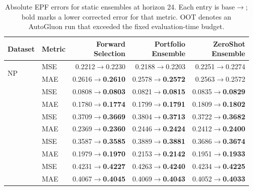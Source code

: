 \begin{table}[t]
\centering
\small
\setlength{\tabcolsep}{5pt}
\caption{Absolute EPF errors for static ensembles at horizon 24. Each entry is base$\rightarrow$\method{}; bold marks a lower corrected error for that metric. OOT denotes an AutoGluon run that exceeded the fixed evaluation-time budget.}
\label{tab:strong-epf-absolute-ensembles}
\begin{tabular}{llrrr}
\toprule
Dataset & Metric & \shortstack{Forward\\Selection} & \shortstack{Portfolio\\Ensemble} & \shortstack{ZeroShot\\Ensemble}\\
\midrule
\multirow{2}{*}{NP} & MSE & 0.2212$\rightarrow$0.2230 & 0.2188$\rightarrow$0.2203 & 0.2251$\rightarrow$0.2274\\
 & MAE & 0.2616$\rightarrow$\textbf{0.2610} & 0.2578$\rightarrow$\textbf{0.2572} & 0.2563$\rightarrow$0.2572\\
\addlinespace[1pt]
\multirow{2}{*}{PJM} & MSE & 0.0808$\rightarrow$\textbf{0.0803} & 0.0821$\rightarrow$\textbf{0.0815} & 0.0835$\rightarrow$\textbf{0.0829}\\
 & MAE & 0.1780$\rightarrow$\textbf{0.1774} & 0.1799$\rightarrow$\textbf{0.1791} & 0.1809$\rightarrow$\textbf{0.1802}\\
\addlinespace[1pt]
\multirow{2}{*}{BE} & MSE & 0.3709$\rightarrow$\textbf{0.3669} & 0.3804$\rightarrow$\textbf{0.3713} & 0.3722$\rightarrow$\textbf{0.3682}\\
 & MAE & 0.2369$\rightarrow$\textbf{0.2360} & 0.2446$\rightarrow$\textbf{0.2424} & 0.2412$\rightarrow$\textbf{0.2400}\\
\addlinespace[1pt]
\multirow{2}{*}{FR} & MSE & 0.3587$\rightarrow$\textbf{0.3585} & 0.3889$\rightarrow$\textbf{0.3881} & 0.3686$\rightarrow$\textbf{0.3674}\\
 & MAE & 0.1979$\rightarrow$\textbf{0.1970} & 0.2153$\rightarrow$\textbf{0.2142} & 0.1951$\rightarrow$\textbf{0.1933}\\
\addlinespace[1pt]
\multirow{2}{*}{DE} & MSE & 0.4231$\rightarrow$\textbf{0.4227} & 0.4263$\rightarrow$\textbf{0.4240} & 0.4234$\rightarrow$\textbf{0.4225}\\
 & MAE & 0.4067$\rightarrow$\textbf{0.4045} & 0.4069$\rightarrow$\textbf{0.4043} & 0.4052$\rightarrow$\textbf{0.4033}\\
\bottomrule
\end{tabular}
\end{table}

